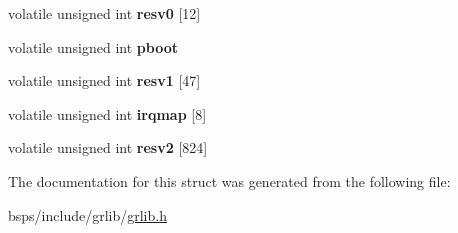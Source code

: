 \begin{DoxyCompactItemize}
volatile unsigned int {\bfseries resv0} \mbox{[}12\mbox{]}
\item 
\mbox{\label{structirqmp__regs_a96d5d25b3ced1837fa0ad8890691fc84}} 
volatile unsigned int {\bfseries pboot}
\item 
\mbox{\label{structirqmp__regs_aa2c876a6e7ab76c04927b739a116c4e2}} 
volatile unsigned int {\bfseries resv1} \mbox{[}47\mbox{]}
\item 
\mbox{\label{structirqmp__regs_af3833690fa95ca5ff76e76e4da7ee862}} 
volatile unsigned int {\bfseries irqmap} \mbox{[}8\mbox{]}
\item 
\mbox{\label{structirqmp__regs_aeee428d7dfabb1a29a014274498d21f3}} 
volatile unsigned int {\bfseries resv2} \mbox{[}824\mbox{]}
\end{DoxyCompactItemize}


The documentation for this struct was generated from the following file\+:\begin{DoxyCompactItemize}
\item 
bsps/include/grlib/\mbox{\hyperlink{grlib_8h}{grlib.\+h}}\end{DoxyCompactItemize}
